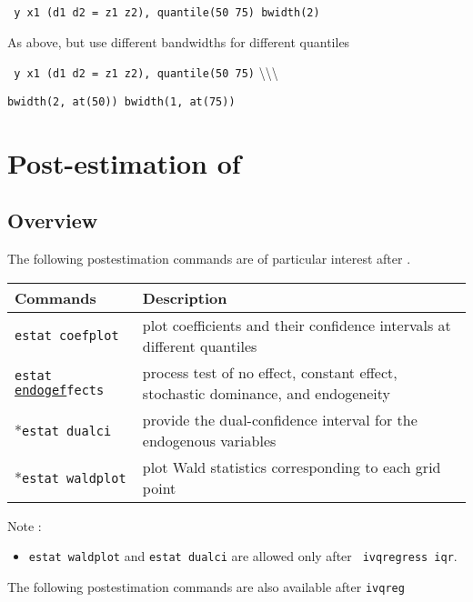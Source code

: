 \vskip 0.2cm 
{\tt \ivqregsee\ y x1 (d1 d2 = z1 z2), quantile(50 75) bwidth(2)}


\vskip 0.2cm
\noindent
As above, but use different bandwidths for different quantiles

\vskip 0.2cm 
{\tt \ivqregsee\ y x1 (d1 d2 = z1 z2), quantile(50 75)}	
\hskip 2cm
\textbackslash\textbackslash\textbackslash

\hskip 3cm {\tt bwidth(2, at(50)) bwidth(1, at(75)) }


\clearpage
\section{Post-estimation of {\ivqreg}} \label{sec:post_syntax}
\subsection{Overview}

The following postestimation commands are of particular interest after {\ivqreg}.

\vskip 0.5cm
\begin{tabular}{ll}
\hline
Commands & Description \\
\hline
{\tt estat coefplot} & plot coefficients and their confidence intervals at
different quantiles\\
{\tt estat \underline{endogef}fects} & process test of no effect, constant effect, stochastic
dominance, and endogeneity \\
*{\tt estat dualci} & provide the dual-confidence interval for the endogenous 
variables \\
*{\tt estat waldplot} & plot Wald statistics corresponding to each grid point
\\
\hline
\end{tabular}

\vskip 0.5cm
Note :
\begin{itemize}
  \item {\tt estat waldplot} and {\tt estat dualci} are allowed only after {\tt
    ivqregress iqr}.
\end{itemize}

\vskip 0.5cm

\noindent
The following postestimation commands are also available after {\tt ivqreg}

